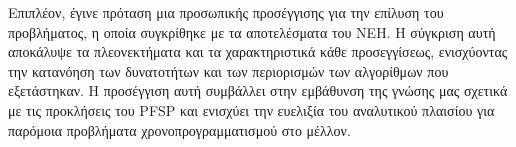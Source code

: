 \documentclass[paper=a4, fontsize=11pt]{scrartcl}
\numberwithin{equation}{section}		%
\numberwithin{figure}{section}			%
\numberwithin{table}{section}				%
\begin{document}
    Επιπλέον, έγινε πρόταση μια προσωπικής προσέγγισης για την επίλυση του προβλήματος, η οποία συγκρίθηκε με τα αποτελέσματα του NEH. Η σύγκριση αυτή αποκάλυψε τα πλεονεκτήματα και τα χαρακτηριστικά κάθε προσεγγίσεως, ενισχύοντας την κατανόηση των δυνατοτήτων και των περιορισμών των αλγορίθμων που εξετάστηκαν. Η προσέγγιση αυτή συμβάλλει στην εμβάθυνση της γνώσης μας σχετικά με τις προκλήσεις του PFSP και ενισχύει την ευελιξία του αναλυτικού πλαισίου για παρόμοια προβλήματα χρονοπρογραμματισμού στο μέλλον.
 
\end{document}

